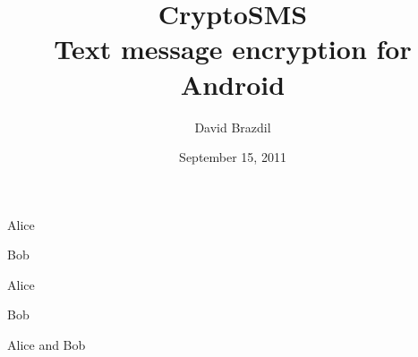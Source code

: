 \documentclass{beamer}
\title[CryptoSMS]{CryptoSMS\\Text message encryption for Android}
\author{David Brazdil}
\institute{University of Cambridge}
\date{September 15, 2011}
\begin{document}
%


\begin{frame}{Alice}
	\begin{center}
		\framebox{\texttt{[image: A1]}}
		\framebox{\texttt{[image: A2]}}
		\framebox{\texttt{[image: A4]}}
	\end{center}
\end{frame}

\begin{frame}{Bob}
	\begin{center}
		\framebox{\texttt{[image: B1]}}
		\framebox{\texttt{[image: B2]}}
		\framebox{\texttt{[image: B3]}}
	\end{center}
\end{frame}

\begin{frame}{Alice}
	\begin{center}
		\framebox{\texttt{[image: A5]}}
		\framebox{\texttt{[image: A6]}}
	\end{center}
\end{frame}

\begin{frame}{Bob}
	\begin{center}
		\framebox{\texttt{[image: B4]}}
		\framebox{\texttt{[image: B5]}}
	\end{center}
\end{frame}

\begin{frame}{Alice and Bob}
	\begin{center}
		\framebox{\texttt{[image: A7]}}
		\framebox{\texttt{[image: B6]}}
	\end{center}
\end{frame}
\end{document}
